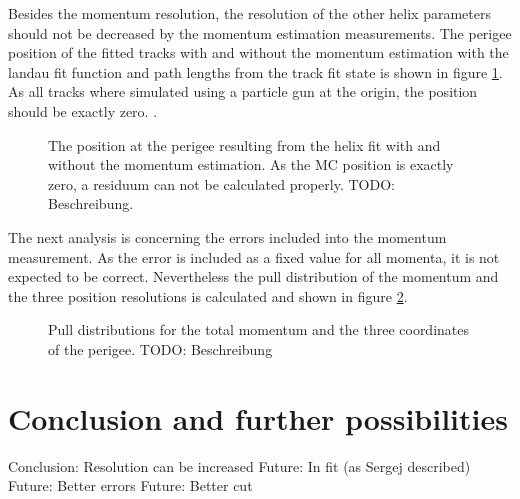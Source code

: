 Besides the momentum resolution, the resolution of the other helix parameters should not be decreased by the momentum estimation measurements. The perigee position of the fitted tracks with and without the momentum estimation with the landau fit function and path lengths from the track fit state is shown in figure \ref{fig-position}. As all tracks where simulated using a particle gun at the origin, the position should be exactly zero. .

\begin{figure}
  \centering
  \caption[erigee position with and without the momentum estimation.]{The position at the perigee resulting from the helix fit with and without the momentum estimation. As the MC position is exactly zero, a residuum can not be calculated properly. TODO: Beschreibung.}
  \label{fig-position}
\end{figure}


The next analysis is concerning the errors included into the momentum measurement. As the error is included as a fixed value for all momenta, it is not expected to be correct. Nevertheless the pull distribution of the momentum and the three position resolutions is calculated and shown in figure \ref{fig-pull}. 

\begin{figure}
  \centering

  \caption[Pull distributions for the total momentum and the three coordinates of the perigee.]{Pull distributions for the total momentum and the three coordinates of the perigee. TODO: Beschreibung}
  \label{fig-pull}
\end{figure}


\section{Conclusion and further possibilities}

Conclusion: Resolution can be increased
Future: In fit (as Sergej described)
Future: Better errors
Future: Better cut